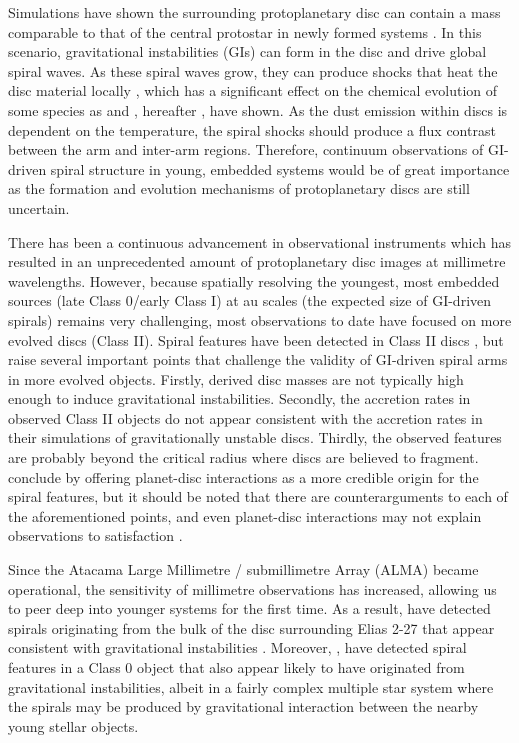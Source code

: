 \documentclass[fleqn,usenatbib]{mnras}
\newcommand{\alma}{ALMA}
\begin{document}
Simulations have shown the surrounding protoplanetary disc can contain a mass comparable to that of the central protostar in newly formed systems \citep[e.g.][]{Machida&Matsumoto2011}. In this scenario, gravitational instabilities (GIs) can form in the disc and drive global spiral waves. As these spiral waves grow, they can produce shocks that heat the disc material locally \citep[e.g.][]{Harker&Desch2002, Boley&Durisen2008, Bae&Hartmann2014}, which has a significant effect on the chemical evolution of some species as \citet{Ilee&Caselli2011} and \citet{Evans&Ilee2015}, hereafter , have shown. As the dust emission within discs is dependent on the temperature, the spiral shocks should produce a flux contrast between the arm and inter-arm regions. Therefore, continuum observations of GI-driven spiral structure in young, embedded systems would be of great importance as the formation and evolution mechanisms of protoplanetary discs are still uncertain.

\smallskip

There has been a continuous advancement in observational instruments which has resulted in an unprecedented amount of protoplanetary disc images at millimetre wavelengths. However, because spatially resolving the youngest, most embedded sources (late Class 0/early Class I) at au scales (the expected size of GI-driven spirals) remains very challenging, most observations to date have focused on more evolved discs (Class II). Spiral features have been detected in Class II discs \citep[e.g.][]{Muto&Grady2012, Benisty&Juhasz2015}, but \citet[][]{Dong&Hall2015} raise several important points that challenge the validity of GI-driven spiral arms in more evolved objects. Firstly, derived disc masses are not typically high enough to induce gravitational instabilities. Secondly, the accretion rates in observed Class II objects do not appear consistent with the accretion rates in their simulations of gravitationally unstable discs. Thirdly, the observed features are probably beyond the critical radius where discs are believed to fragment. \citet[][]{Dong&Hall2015} conclude by offering planet-disc interactions as a more credible origin for the spiral features, but it should be noted that there are counterarguments to each of the aforementioned points, and even planet-disc interactions may not explain observations to satisfaction \citep{Richert&Lyra2015}.

\smallskip

Since the Atacama Large Millimetre / submillimetre Array (\alma) became operational, the sensitivity of millimetre observations has increased, allowing us to peer deep into younger systems for the first time. As a result, \citet{Perez&Carpenter2016} have detected spirals originating from the bulk of the disc surrounding Elias 2-27 that appear consistent with gravitational instabilities \citep{Tomida&Machida2017, Meru&Juhasz2017}. Moreover, \citet{Tobin&Kratter2016}, have detected spiral features in a Class 0 object that also appear likely to have originated from gravitational instabilities, albeit in a fairly complex multiple star system where the spirals may be produced by gravitational interaction between the nearby young stellar objects. 
\end{document}
